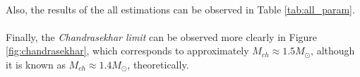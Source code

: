 \documentclass[letterpaper,12pt]{article}
\begin{document}
\paragraph{} Also, the results of the all estimations can be observed in Table \ref{tab:all_param}.

\begin{table}[H]
    \centering
    \caption{Overall Estimated Parameter Set}
    \label{tab:all_param}
    \end{table}

\paragraph{} Finally, the \textit{Chandrasekhar limit} can be observed more clearly in Figure \ref{fig:chandrasekhar}, which corresponds to approximately $M_{ch} \approx 1.5 M_\odot$, although it is known as $M_{ch} \approx 1.4 M_\odot$, theoretically.
\end{document}

